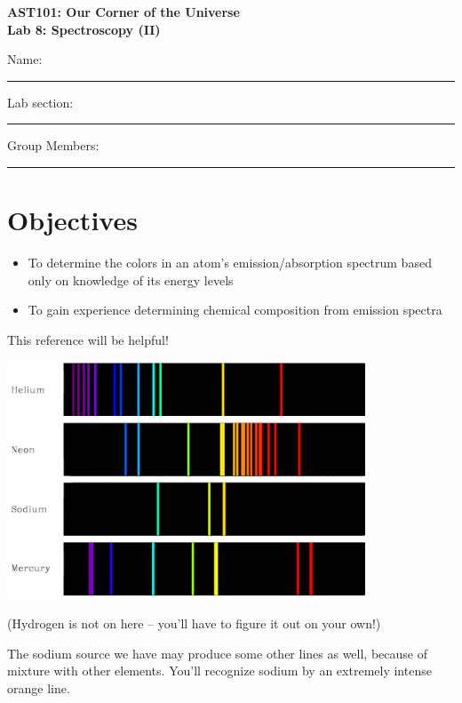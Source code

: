 \documentclass[11pt]{article}
\begin{document}
\begin{center}
\textbf{\Large
AST101: Our Corner of the Universe \\
\vspace*{0.1cm}
Lab 8: Spectroscopy (II)
}
\end{center}

\vspace*{0.5cm}

{\Large Name:}\vspace*{0.5cm}\\\hrule
{\Large Lab section:}\vspace*{0.5cm}\\\hrule
{\Large Group Members:}\vspace*{0.5cm}\\\hrule
\vspace*{0.5cm}


\section{Objectives}
\begin{itemize}
	\item To determine the colors in an atom's emission/absorption spectrum based only on knowledge of its energy levels
	\item To gain experience determining chemical composition from emission spectra
\end{itemize}

\begin{center}
	\large This reference will be helpful!
	
	\includegraphics[width=0.8\textwidth]{spectra.png}
	
	(Hydrogen is not on here -- you'll have to figure it out on your own!)
	
	The sodium source we have may produce some other lines as well, because of mixture with other elements. You'll recognize
	sodium by an extremely intense orange line.
\end{center}
\newpage
\end{document}

